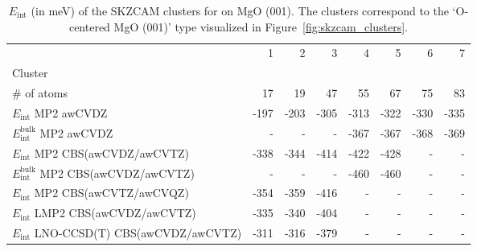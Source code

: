 \begin{table}
\caption{\label{tab:system_eint_mgo_c6h6}$E_\textrm{int}$ (in meV) of the SKZCAM clusters for  on MgO (001). The clusters correspond to the `O-centered MgO (001)' type visualized in Figure~\ref{fig:skzcam_clusters}.}
\begin{adjustbox}{center,max width=1.4\textwidth}
\begin{tabular}{lrrrrrrr}
\toprule
 & 1 & 2 & 3 & 4 & 5 & 6 & 7 \\ 
Cluster &  &  &  &  &  &  &  \\
\midrule
\# of atoms & 17 & 19 & 47 & 55 & 67 & 75 & 83 \\
$E_\textrm{int}$ MP2 awCVDZ & -197 & -203 & -305 & -313 & -322 & -330 & -335 \\
$E_\textrm{int}^\textrm{bulk}$ MP2 awCVDZ & - & - & - & -367 & -367 & -368 & -369 \\
$E_\textrm{int}$ MP2 CBS(awCVDZ/awCVTZ) & -338 & -344 & -414 & -422 & -428 & - & - \\
$E_\textrm{int}^\textrm{bulk}$ MP2 CBS(awCVDZ/awCVTZ) & - & - & - & -460 & -460 & - & - \\
$E_\textrm{int}$ MP2 CBS(awCVTZ/awCVQZ) & -354 & -359 & -416 & - & - & - & - \\
$E_\textrm{int}$ LMP2 CBS(awCVDZ/awCVTZ) & -335 & -340 & -404 & - & - & - & - \\
$E_\textrm{int}$ LNO-CCSD(T) CBS(awCVDZ/awCVTZ) & -311 & -316 & -379 & - & - & - & - \\
\bottomrule
\end{tabular}
\end{adjustbox}
\end{table}

